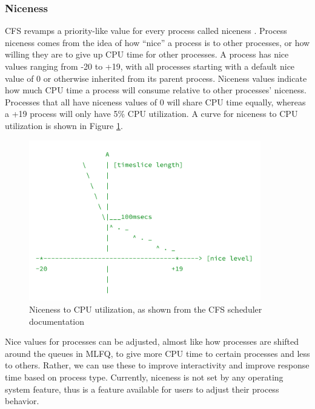 \documentclass[12pt]{article}
\def\ind{\hspace*{0.3in}}
\begin{document}
\subsubsection*{Niceness}

\ind CFS revamps a priority-like value for every process called niceness \cite{InfluenceSchedulingPriority2006}. Process niceness comes from the idea of how ``nice'' a process is to other processes, or how willing they are to give up CPU time for other processes. A process has nice values ranging from -20 to +19, with all processes starting with a default nice value of 0 or otherwise inherited from its parent process. Niceness values indicate how much CPU time a process will consume relative to other processes' niceness. Processes that all have niceness values of 0 will share CPU time equally, whereas a +19 process will only have 5\% CPU utilization. A curve for niceness to CPU utilization is shown in Figure \ref{fig:niceness}.

\begin{figure}
    \centering
    \includegraphics[width=0.9\textwidth]{images/niceness.png}
    \caption{Niceness to CPU utilization, as shown from the CFS scheduler documentation \cite{DocumentationSchedulerSchednicedesign}}
    \label{fig:niceness}
\end{figure}

Nice values for processes can be adjusted, almost like how processes are shifted around the queues in MLFQ, to give more CPU time to certain processes and less to others. Rather, we can use these to improve interactivity and improve response time based on process type. Currently, niceness is not set by any operating system feature, thus is a feature available for users to adjust their process behavior. 
\end{document}
